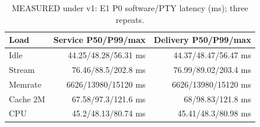 \begin{table}[H]
\centering\small
\caption{MEASURED under v1: E1 P0 software/PTY latency (ms); three repeats.}\label{tab:e1}
\begin{tabular}{lrr}
\toprule
Load & Service P50/P99/max & Delivery P50/P99/max \\
\midrule
Idle & 44.25/48.28/56.31 ms & 44.37/48.47/56.47 ms \\
Stream & 76.46/88.5/202.8 ms & 76.99/89.02/203.4 ms \\
Memrate & 6626/13980/15120 ms & 6626/13980/15120 ms \\
Cache 2M & 67.58/97.3/121.6 ms & 68/98.83/121.8 ms \\
CPU & 45.2/48.13/80.74 ms & 45.41/48.3/80.98 ms \\
\bottomrule
\end{tabular}
\end{table}
